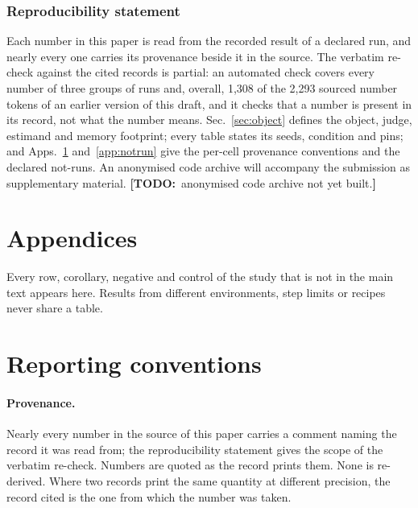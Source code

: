 \documentclass{article} %
\newcommand{\TODO}[1]{{\color{orange}\textbf{[TODO:}~#1\textbf{]}}}
\begin{document}
\subsubsection*{Reproducibility statement}
Each number in this paper is read from the recorded result of a declared run, and nearly every
one carries its provenance beside it in the source. The verbatim re-check against the cited records
is partial: an automated check covers every number of three groups of runs and, overall, 1,308 of %
the 2,293 sourced number tokens of an earlier version of this draft, and it checks that a number is %
present in its record, not what the number means. Sec.~\ref{sec:object} defines the
object, judge, estimand and memory footprint; every table states its seeds, condition and pins; and
Apps.~\ref{app:conventions} and~\ref{app:notrun} give the per-cell provenance conventions and
the declared not-runs. An anonymised code archive will accompany the submission as
supplementary material. \TODO{anonymised code archive not yet built.}


\clearpage
\appendix
\section*{Appendices}
Every row, corollary, negative and control of the study that is
not in the main text appears here. Results from different
environments, step limits or recipes never share a table.

\section{Reporting conventions}
\label{app:conventions}

\paragraph{Provenance.} Nearly every number in the source of this paper carries a comment naming
the record it was read from; the reproducibility statement gives the scope of the verbatim re-check. Numbers are quoted as the record prints them. None is
re-derived. Where two records print the same quantity at different precision, the record
cited is the one from which the number was taken.
\end{document}
